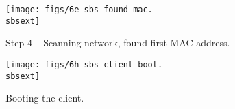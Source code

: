 

\clearpage

\begin{figure}[htbp]
  \begin{center}
    \texttt{[image: figs/6e\_sbs-found-mac.\\sbsext]}
    \caption{Step 4 -- Scanning network, found first MAC address.}
    \label{fig:sbs-setup-network2}
  \end{center}
\end{figure}




\setlength{\oddsidemargin}{-0.5in}
\setlength{\evensidemargin}{-0.5in}
\setlength{\textwidth}{7.5in}

\begin{figure}[htbp]
  \begin{center}
    \texttt{[image: figs/6h\_sbs-client-boot.\\sbsext]}
    \caption{Booting the client.}
    \label{fig:sbs-install-boot}
  \end{center}
\end{figure}

